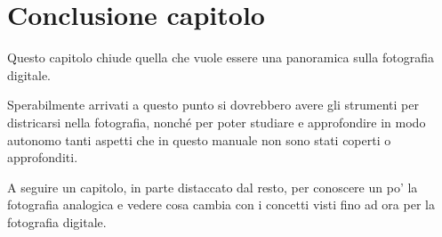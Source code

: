 \section{Conclusione capitolo} \label{sec:conclusione_rudimenti_non}
Questo capitolo chiude quella che vuole essere una panoramica sulla fotografia digitale.

Sperabilmente arrivati a questo punto si dovrebbero avere gli strumenti per districarsi nella fotografia, nonché per poter studiare e approfondire in modo autonomo tanti aspetti che in questo manuale non sono stati coperti o approfonditi.

A seguire un capitolo, in parte distaccato dal resto, per conoscere un po' la fotografia analogica e vedere cosa cambia con i concetti visti fino ad ora per la fotografia digitale.
